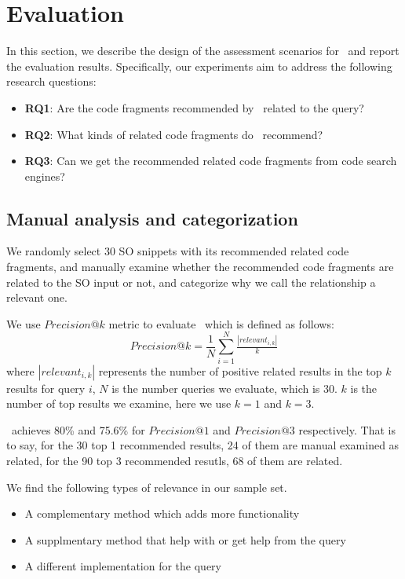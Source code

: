 \section{Evaluation}
\label{sec:Evaluation}
In this section, we describe the design of the assessment scenarios for \tool\ and report the evaluation results. Specifically, our experiments aim to address the following research questions:
\begin{itemize}
	\item \textbf{RQ1}: Are the code fragments recommended by \tool\ related to the query?
	\item \textbf{RQ2}: What kinds of related code fragments do \tool\ recommend?
	\item \textbf{RQ3}: Can we get the recommended related code fragments from code search engines?
\end{itemize}

\subsection{Manual analysis and categorization}
We randomly select 30 SO snippets with its recommended related code fragments, and manually examine whether the recommended code fragments are related to the SO input or not, and categorize why we call the relationship a relevant one.

We use $Precision@k$ metric to evaluate \tool\  which is defined as follows:
\begin{equation}
Precision@k = \frac{1}{N}\sum_{i=1}^{N}\tfrac{\left | relevant_{i,k} \right |}{k}
\end{equation}
where $\left | relevant_{i,k} \right |$ represents the number of positive related results in the top $k$ results for query $i$, $N$ is the number queries we evaluate, which is $30$. $k$ is the number of top results we examine, here we use $k=1$ and $k=3$.

\tool\ achieves 80\% and 75.6\% for $Precision@1$ and $Precision@3$ respectively. That is to say, for the 30 top 1 recommended results, 24 of them are manual examined as related, for the 90 top 3 recommended resutls, 68 of them are related.

We find the following types of relevance in our sample set.
\begin{itemize}
	\item A complementary method which adds more functionality
	\item A supplmentary method that help with or get help from the query 
	\item A different implementation for the query	
\end{itemize}

